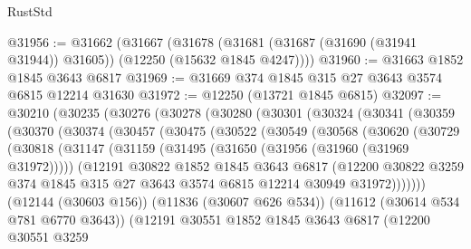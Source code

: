 \begin{lexlean}{RustStd}
\begin{coremodule}
@31956 := @31662
    (@31667
      (@31678 (@31681 (@31687 (@31690 (@31941 @31944)) @31605)) (@12250 (@15632 @1845 @4247))))
@31960 := @31663 @1852 @1845 @3643 @6817
@31969 := @31669 @374 @1845 @315 @27 @3643 @3574 @6815 @12214 @31630
@31972 := @12250 (@13721 @1845 @6815)
@32097 := @30210
    (@30235
      (@30276
        (@30278
          (@30280
            (@30301
              (@30324
                (@30341
                  (@30359
                    (@30370
                      (@30374
                        (@30457
                          (@30475
                            (@30522
                              (@30549
                                (@30568
                                  (@30620
                                    (@30729
                                      (@30818
                                        (@31147
                                          (@31159
                                            (@31495 (@31650 (@31956 (@31960 (@31969 @31972)))))
                                            (@12191
                                              @30822
                                              @1852
                                              @1845
                                              @3643
                                              @6817
                                              (@12200
                                                @30822
                                                @3259
                                                @374
                                                @1845
                                                @315
                                                @27
                                                @3643
                                                @3574
                                                @6815
                                                @12214
                                                @30949
                                                @31972)))))))
                                  (@12144 (@30603 @156))
                                  (@11836 (@30607 @626 @534))
                                  (@11612 (@30614 @534 @781 @6770 @3643))
                                  (@12191
                                    @30551
                                    @1852
                                    @1845
                                    @3643
                                    @6817
                                    (@12200
                                      @30551
                                      @3259

\end{coremodule}
\end{lexlean}
